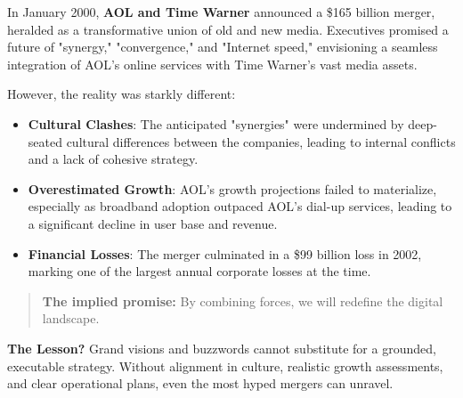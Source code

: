     \begin{tcolorbox}[colback=blue!5!white, colframe=blue!50!black,
      title={Historical Sidebar: The AOL–Time Warner Merger — When Buzzwords Trumped Business Sense}]
    
    In January 2000, \textbf{AOL and Time Warner} announced a \$165 billion merger, heralded as a transformative union of old and new media. Executives promised a future of "synergy," "convergence," and "Internet speed," envisioning a seamless integration of AOL's online services with Time Warner's vast media assets.
    
    \medskip
    
    However, the reality was starkly different:
    
    \begin{itemize}
      \item \textbf{Cultural Clashes}: The anticipated "synergies" were undermined by deep-seated cultural differences between the companies, leading to internal conflicts and a lack of cohesive strategy.
      \item \textbf{Overestimated Growth}: AOL's growth projections failed to materialize, especially as broadband adoption outpaced AOL's dial-up services, leading to a significant decline in user base and revenue.
      \item \textbf{Financial Losses}: The merger culminated in a \$99 billion loss in 2002, marking one of the largest annual corporate losses at the time.
    \end{itemize}
    
    \medskip
    
    \begin{quote}
    \textbf{The implied promise:} By combining forces, we will redefine the digital landscape.
    \end{quote}
    
    \medskip
    
    \textbf{The Lesson?} Grand visions and buzzwords cannot substitute for a grounded, executable strategy. Without alignment in culture, realistic growth assessments, and clear operational plans, even the most hyped mergers can unravel.
    
    \end{tcolorbox}
